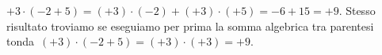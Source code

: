 \begin{exrig}
 \begin{esempio}
 $+3\cdot(-2+5)=(+3)\cdot(-2)+(+3)\cdot(+5)=-6+15=+9$.
Stesso risultato troviamo se eseguiamo per prima la somma algebrica tra parentesi
tonda~$(+3)\cdot(-2+5)=(+3)\cdot(+3)=+9$.
 \end{esempio}

\end{exrig}

\ovalbox{\risolvii \ref{ese:2.28}, \ref{ese:2.29}}

\newpage

\cleardoublepage
